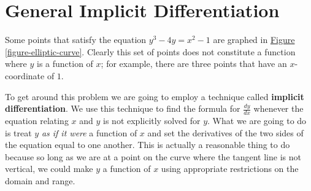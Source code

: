 \documentclass[10pt,oneside,]{book}
\newcommand{\terminology}[1]{\textbf{#1}}
\theoremstyle{plain}
\theoremstyle{definition}
\numberwithin{equation}{section}
\newcounter{figstack}
\newcounter{figindex}
\newlength\fight
\newcommand\pushValignCaptionBottom[5][b]{%
\stepcounter{figstack}%
\expandafter\def\csname %
figalign\romannumeral\value{figstack}\endcsname{#1}%
\expandafter\def\csname %
figtype\romannumeral\value{figstack}\endcsname{#2}%
\expandafter\def\csname %
figwd\romannumeral\value{figstack}\endcsname{#3}%
\expandafter\def\csname %
figcontent\romannumeral\value{figstack}\endcsname{#4}%
\expandafter\def\csname %
figcap\romannumeral\value{figstack}\endcsname{#5}%
\setbox0=\hbox{%
\begin{#2}{#3}#4\end{#2}}%
\ifdim\dimexpr\ht0+\dp0\relax>\fight\global\setlength{\fight}{%
\dimexpr\ht0+\dp0\relax}\fi%
}
\newcommand\popValignCaptionBottom{%
\setcounter{figindex}{0}%
\hfill%
\whiledo{\value{figindex}<\value{figstack}}{%
\stepcounter{figindex}%
\def\tmp{\csname figwd\romannumeral\value{figindex}\endcsname}%
\begin{\csname figtype\romannumeral\value{figindex}\endcsname}[t]{\tmp}%
\centering%
\stackinset{c}{}%
{\csname figalign\romannumeral\value{figindex}\endcsname}{}%
{\csname figcontent\romannumeral\value{figindex}\endcsname}%
{\rule{0pt}{\fight}}\par%
\csname figcap\romannumeral\value{figindex}\endcsname%
\end{\csname figtype\romannumeral\value{figindex}\endcsname}%
\hfill%
}%
\setcounter{figstack}{0}%
\setlength{\fight}{0pt}%
\hfill%
}
\newcommand{\lz}[2]{\frac{d#1}{d#2}}
\begin{document}
\section[General Implicit Differentiation]{General Implicit Differentiation}\label{section-general-implicit-differentiation}
Some points that satisfy the equation \(y^3-4y=x^2-1\) are graphed in \hyperref[figure-elliptic-curve]{Figure \ref{figure-elliptic-curve}}.  Clearly this set of points does not constitute a function where \(y\) is a function of \(x\); for example, there are three points that have an \(x\)-coordinate of \(1\).%
\par
To get around this problem we are going to employ a technique called \terminology{implicit differentiation}.  We use this technique to find the formula for \(\lz{y}{x}\) whenever the equation relating \(x\) and \(y\) is not explicitly solved for \(y\).  What we are going to do is treat \(y\) \emph{as if it were} a function of \(x\) and set the derivatives of the two sides of the equation equal to one another.  This is actually a reasonable thing to do because so long as we are at a point on the curve where the tangent line is not vertical, we could make \(y\) a function of \(x\) using appropriate restrictions on the domain and range.%
\end{document}
